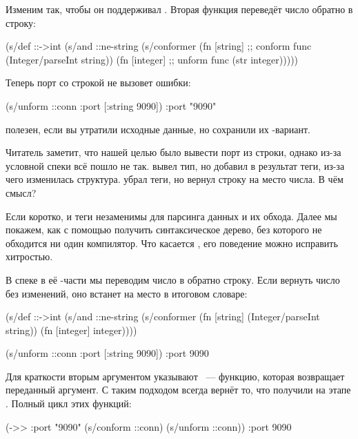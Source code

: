 Изменим  так, чтобы он поддерживал . Вторая функция
переведёт число обратно в строку:

\begin{clojure}
(s/def ::->int
  (s/and
   ::ne-string
   (s/conformer
    (fn [string] ;; conform func
      (Integer/parseInt string))
    (fn [integer] ;; unform func
      (str integer)))))
\end{clojure}

\noindent
Теперь порт со строкой не вызовет ошибки:

\begin{clojure}
(s/unform ::conn {:port [:string 9090]})
{:port "9090"}
\end{clojure}

 полезен, если вы утратили исходные данные, но сохранили их
-вариант.

Читатель заметит, что нашей целью было вывести порт из строки, однако из-за
условной спеки  всё пошло не так.  вывел тип, но
добавил в результат теги, из-за чего изменилась структура.  убрал
теги, но вернул строку на место числа. В чём смысл?

Если коротко,  и теги незаменимы для парсинга данных и их
обхода. Далее мы покажем, как с помощью  получить синтаксическое
дерево, без которого не обходится ни один компилятор. Что касается
, его поведение можно исправить хитростью.

В спеке  в её -части мы переводим число в обратно
строку. Если вернуть число без изменений, оно встанет на место  в
итоговом словаре:

\begin{clojure}
(s/def ::->int
  (s/and
   ::ne-string
   (s/conformer
    (fn [string]
      (Integer/parseInt string))
    (fn [integer]
      integer))))

(s/unform ::conn {:port [:string 9090]})
{:port 9090}
\end{clojure}


Для краткости вторым аргументом указывают ~--- функцию, которая
возвращает переданный аргумент. С таким подходом  всегда вернёт то,
что получили на этапе . Полный цикл этих функций:

\begin{clojure}
(->> {:port "9090"}
     (s/conform ::conn)
     (s/unform ::conn))
{:port 9090}
\end{clojure}

